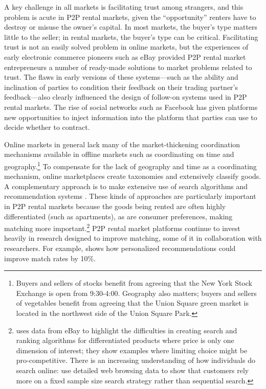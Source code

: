 \documentclass[11pt]{article}
\begin{document}
A key challenge in all markets is facilitating trust among strangers, and this problem is acute in P2P rental markets, given the ``opportunity'' renters have to destroy or misuse the owner's capital.
In most markets, the buyer's type matters little to the seller; in rental markets, the buyer's type can be critical. 
Facilitating trust is not an easily solved problem in online markets, but the experiences of early electronic commerce pioneers such as eBay provided P2P rental market entrepreneurs a number of ready-made solutions to market problems related to trust. 
The flaws in early versions of these systems---such as the ability and inclination of parties to condition their feedback on their trading partner's feedback---also clearly influenced the design of follow-on systems used in P2P rental markets. 
The rise of social networks such as Facebook has given platforms new opportunities to inject information into the platform that parties can use to decide whether to contract. 

Online markets in general lack many of the market-thickening coordination mechanisms available in offline markets such as coordinating on time and geography.\footnote{
  Buyers and sellers of stocks benefit from agreeing that the New York Stock Exchange is open from 9:30-4:00.
  Geography also matters; buyers and sellers of vegetables benefit from agreeing that the Union Square green market is located in the northwest side of the Union Square Park.
}
To compensate for the lack of geography and time as a coordinating mechanism, online marketplaces create taxonomies and extensively classify goods.
A complementary approach is to make extensive use of search algorithms and recommendation systems \citep{resnick1997recommender, adomavicius2005toward}.
These kinds of approaches are particularly important in P2P rental markets because the goods being rented are often highly differentiated (such as apartments), as are consumer preferences, making matching more important.\footnote{
  \cite{dinerstein2014consumer} uses data from eBay to highlight the difficulties in creating search and ranking algorithms for differentiated products where price is only one dimension of interest; they show examples where limiting choice might be pro-competitive.
  There is an increasing understanding of how individuals do search online: 
  \cite{de2012testing} use detailed web browsing data to show that customers rely more on a fixed sample size search strategy rather than sequential search.  
}
P2P rental market platforms continue to invest heavily in research designed to improve matching, some of it in collaboration with researchers. 
For example, \cite{fradkin2013search} shows how personalized recommendations could improve match rates by 10\%. 
\end{document}
